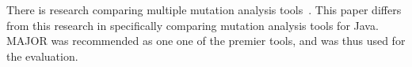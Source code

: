 
There is research comparing multiple mutation analysis tools~\cite{ComparingAutomatedMutationTools:2013}. This paper differs from this research in specifically comparing mutation analysis tools for Java. MAJOR was recommended as one one of the premier tools, and was thus used for the evaluation.
